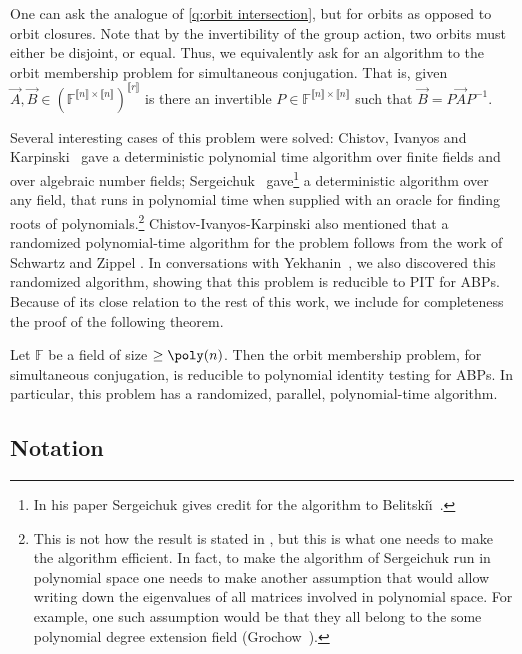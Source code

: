 \documentclass[letterpaper,11pt]{article}
\numberwithin{equation}{section}
\theoremstyle{plain}
\theoremstyle{remark}
\newcommand{\zr}[1]{{\llbracket {#1}\rrbracket}}
\newcommand{\F}{\mathbb{F}}
\begin{document}

One can ask the analogue of \autoref{q:orbit intersection}, but for orbits as opposed to orbit closures.  Note that by the invertibility of the group action, two orbits must either be disjoint, or equal.  Thus, we equivalently ask for an algorithm to the orbit membership problem for simultaneous conjugation.  That is, given $\vec{A},\vec{B}\in(\F^{\zr{n}\times \zr{n}})^{\zr{r}}$ is there an invertible $P\in\F^{\zr{n}\times\zr{n}}$ such that $\vec{B}=P\vec{A}P^{-1}$.  

Several interesting cases of this problem were solved: Chistov, Ivanyos and Karpinski~\cite{ChistovIK97}  gave a deterministic polynomial time algorithm over finite fields  and over algebraic number fields; Sergeichuk~\cite{Sergeichuk2000} gave\footnote{In his paper Sergeichuk gives credit for the algorithm to Belitski{\u \i}~\cite{belitskii1983}.} a deterministic algorithm over any field, that runs in polynomial time when supplied with an oracle for finding roots of polynomials.\footnote{This is not how the result is stated in \cite{Sergeichuk2000}, but this is what one needs to make the algorithm efficient. In fact, to make the algorithm of Sergeichuk run in polynomial space one needs to make another assumption that would allow writing down the eigenvalues of all matrices involved in polynomial space. For example, one such assumption would be that they all belong to the some polynomial degree extension field (Grochow~\cite{Grochow13}).} Chistov-Ivanyos-Karpinski also mentioned that a randomized polynomial-time algorithm for the problem follows from the work of Schwartz and Zippel \cite{Schwartz80,Zippel79}.
In conversations with Yekhanin~\cite{Yekhanin2013}, we also discovered this randomized algorithm, showing that this problem is reducible to PIT for ABPs. Because of its close relation to the rest of this work, we include for completeness the proof of the following theorem.

\begin{theorem*}
	Let $\F$ be a field of size $\ge\poly(n)$.  Then the orbit membership problem, for simultaneous conjugation, is reducible to polynomial identity testing for ABPs.  In particular, this problem has a randomized, parallel, polynomial-time algorithm.
\end{theorem*}

\subsection{Notation}\label{notation}
\end{document}
